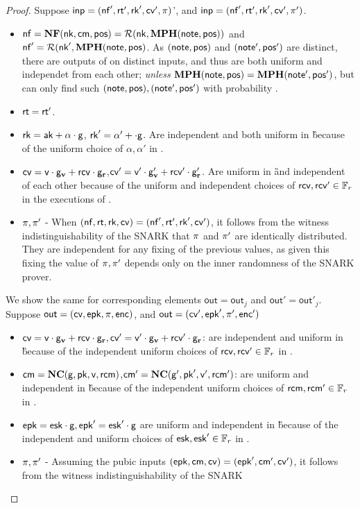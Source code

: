 \documentclass[11pt]{article}
\numberwithin{equation}{section} %
\numberwithin{figure}{section} %
\newcommand{\inp}{\ensuremath{\mathsf{inp}}\xspace}
\newcommand{\out}{\ensuremath{\mathsf{out}}\xspace}
\begin{document}
\begin{proof}
 Suppose $\inp=(\nf',\rt',\rk',\cv',\prf)$', and $\inp=(\nf',\rt',\rk',\cv',\prf')$.
 \begin{itemize}
  \item  $\mathsf{nf} = \mathbf{NF}(\mathsf{nk},\mathsf{cm},\mathsf{pos})=\mathcal R(\mathsf{nk},\mathbf{MPH}(\mathsf{note},\mathsf{pos}))$ and $\mathsf{nf}'=\mathcal R(\mathsf{nk}',\mathbf{MPH}(\mathsf{note},\mathsf{pos})$. As $(\mathsf{note},\mathsf{pos})$ and $(\mathsf{note}',\mathsf{pos}')$ are distinct, there are outputs of \RO on distinct inputs, and thus are both uniform and independet from each other; \emph{unless} $\mathbf{MPH}(\mathsf{note},\mathsf{pos}) = \mathbf{MPH}(\mathsf{note}',\mathsf{pos}')$, but \adv can only find
  such $(\mathsf{note},\mathsf{pos}),(\mathsf{note}',\mathsf{pos}')$ with probability \negl.
  \item $\mathsf{rt}=\mathsf{rt}'$.
  \item $\mathsf{rk}=\mathsf{ak} + \alpha\cdot \mathsf{g}$, $\mathsf{rk}' = \alpha' + \cdot \mathsf{g}$. Are independent and both uniform in \G because of the uniform choice of $\alpha,\alpha'$ in \makerandomizedtx.
  \item $\mathsf{cv}=\mathsf{v}\cdot \mathsf{g}_{\mathbf{v}} + \mathsf{rcv}\cdot \mathsf{g}_\mathbf{r}$,$\mathsf{cv}'=\mathsf{v}'\cdot \mathsf{g}_{\mathbf{v}}' + \mathsf{rcv}'\cdot \mathsf{g}_\mathbf{r}'$. Are uniform in \G and independent of each other because of the uniform and independent choices of $\mathsf{rcv},\mathsf{rcv}'\in {\mathbb F}_r$ in the executions of \makerandomizedtx.
  \item $\pi,\pi'$ - When  $(\mathsf{nf},\mathsf{rt},\mathsf{rk},\mathsf{cv})=(\mathsf{nf}',\mathsf{rt}',\mathsf{rk}',\mathsf{cv}')$, it follows from the witness indistinguishability of the SNARK
  that $\pi$ and $\pi'$ are identically distributed. They are independent for any fixing of the previous values, as given this fixing the value
  of $\pi,\pi'$ depends only on the inner randomness of the SNARK prover.
 \end{itemize}
 We show the same for corresponding elements $\out=\out_j$ and $\out'=\out'_j$.
 Suppose $\out=(\cv,\epk,\prf,\noteenc)$, and $\out=(\cv',\epk',\prf',\noteenc')$ 
 \begin{itemize}
  \item $\mathsf{cv}=\mathsf{v}\cdot \mathsf{g}_{\mathbf{v}} + \mathsf{rcv}\cdot \mathsf{g}_\mathbf{r},\mathsf{cv}'=\mathsf{v}'\cdot \mathsf{g}_{\mathbf{v}} + \mathsf{rcv}'\cdot \mathsf{g}_\mathbf{r}$: are independent and uniform in \G because of the independent uniform choices of $\mathsf{rcv},\mathsf{rcv}'\in {\mathbb F}_r$ in \makerandomizedtx.
  \item $\mathsf{cm} = \mathbf{NC}(\mathsf{g},\mathsf{pk},\mathsf{v},\mathsf{rcm})$,$\mathsf{cm}' = \mathbf{NC}(\mathsf{g}',\mathsf{pk}',\mathsf{v}',\mathsf{rcm}')$: are uniform and independent in \G because of the independent uniform choices of $\mathsf{rcm},\mathsf{rcm}'\in {\mathbb F}_r$ in \makerandomizedoutput.
  \item $\mathsf{epk}=\mathsf{esk}\cdot \mathsf{g},\mathsf{epk}'=\mathsf{esk}'\cdot \mathsf{g}$ are uniform and independent in \G because of the independent and uniform choices of $\mathsf{esk},\mathsf{esk}'\in {\mathbb F}_r$ in \makerandomizedoutput.
  \item $\pi,\pi'$ - Assuming the pubic inputs $(\mathsf{epk},\mathsf{cm},\mathsf{cv})=(\mathsf{epk}',\mathsf{cm}',\mathsf{cv}')$, it follows from the witness indistinguishability of the SNARK

\end{itemize}
\end{proof}
\end{document}
